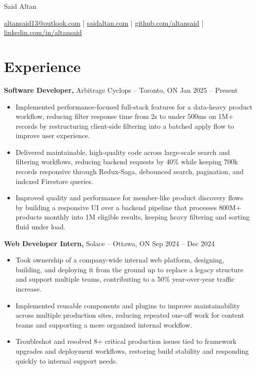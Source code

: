 \documentclass[11pt]{article}       %
\begin{document}
\centerline{\Huge Said Altan}

\vspace{10pt}

\centerline{\href{mailto:altansaid13@outlook.com}{altansaid13@outlook.com} | \href{https://saidaltan.com}{saidaltan.com} | \href{https://github.com/altansaid}{github.com/altansaid} | \href{https://www.linkedin.com/in/altansaid}{linkedin.com/in/altansaid}}


\vspace{5pt}
\section*{Experience}
\textbf{Software Developer,} {Arbitrage Cyclops} -- Toronto, ON \hfill Jan 2025 -- Present \\
\vspace{-9pt}
\begin{itemize}
  \item Implemented performance-focused full-stack features for a data-heavy product workflow, reducing filter response time from 2s to under 500ms on 1M+ records by restructuring client-side filtering into a batched apply flow to improve user experience.
  \item Delivered maintainable, high-quality code across large-scale search and filtering workflows, reducing backend requests by 40\% while keeping 700k records responsive through Redux-Saga, debounced search, pagination, and indexed Firestore queries.
  \item Improved quality and performance for member-like product discovery flows by building a responsive UI over a backend pipeline that processes 800M+ products monthly into 1M eligible results, keeping heavy filtering and sorting fluid under load.
\end{itemize}

\textbf{Web Developer Intern,} {Solace} -- Ottawa, ON \hfill Sep 2024 -- Dec 2024 \\
\vspace{-9pt}
\begin{itemize}
  \item Took ownership of a company-wide internal web platform, designing, building, and deploying it from the ground up to replace a legacy structure and support multiple teams, contributing to a 50\% year-over-year traffic increase.
  \item Implemented reusable components and plugins to improve maintainability across multiple production sites, reducing repeated one-off work for content teams and supporting a more organized internal workflow.
  \item Troubleshot and resolved 8+ critical production issues tied to framework upgrades and deployment workflows, restoring build stability and responding quickly to internal support needs.
\end{itemize}
\end{document}
